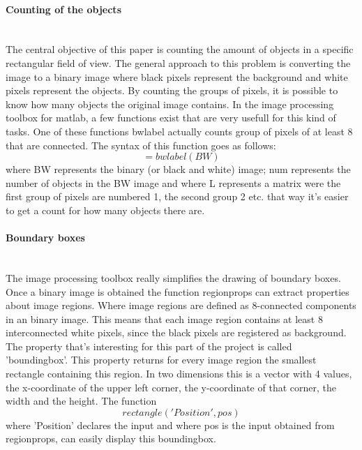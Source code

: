 \documentclass[11pt]{article}
\begin{document}
\paragraph{Counting of the objects}\mbox{}\\
The central objective of this paper is counting the amount of objects in a specific rectangular field of view. The general approach to this problem is converting the image to a binary image where black pixels represent the background and white pixels represent the objects. By counting the groups of pixels, it is possible to know how many objects the original image contains. In the image processing toolbox for matlab\cite{Mathworks}, a few functions exist that are very usefull for this kind of tasks. One of these functions bwlabel actually counts group of pixels of at least 8 that are connected. The syntax of this function goes as follows: 
\begin{equation}
[L, num] = bwlabel(BW)
\end{equation}
where BW represents the binary (or black and white) image; num represents the number of objects in the BW image and where L represents a matrix were the first group of pixels are numbered 1, the second group 2 etc. that way it's easier to get a count for how many objects there are.

\paragraph{Boundary boxes}\mbox{}\\
The image processing toolbox really simplifies the drawing of boundary boxes. Once a binary image is obtained the function regionprops can extract properties about image regions. Where image regions are defined as 8-connected components in an binary image. This means that each image region contains at least 8 interconnected white pixels, since the black pixels are registered as background. The property that's interesting for this part of the project is called 'boundingbox'. This property returns for every image region the smallest rectangle containing this region. In two dimensions this is a vector with 4 values, the x-coordinate of the upper left corner, the y-coordinate of that corner, the width and the height. The function 
\begin{equation}
rectangle('Position', pos)
\end{equation}
where 'Position' declares the input and where pos is the input obtained from regionprops, can easily display this boundingbox. 
\end{document}
